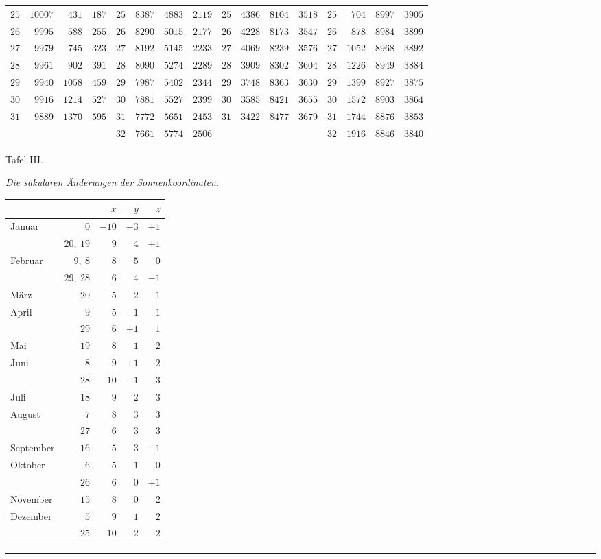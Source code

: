 \begin{center}
{{\begin{minipage}{.96\linewidth}
\begin{tabular}{r|r|r|r||r|r|r|r||r|r|r|r||r|r|r|r}
$25$ & $10007$ & $431$ & $187$ & $25$ & $8387$ & $4883$ & $2119$ & $25$ & $4386$ & $8104$ & $3518$ & $25$ & $704$ & $8997$ & $3905$\\[3pt]
$26$ & $9995$ & $588$ & $255$ & $26$ & $8290$ & $5015$ & $2177$ & $26$ & $4228$ & $8173$ & $3547$ & $26$ & $878$ & $8984$ & $3899$\\
$27$ & $9979$ & $745$ & $323$ & $27$ & $8192$ & $5145$ & $2233$ & $27$ & $4069$ & $8239$ & $3576$ & $27$ & $1052$ & $8968$ & $3892$\\
$28$ & $9961$ & $902$ & $391$ & $28$ & $8090$ & $5274$ & $2289$ & $28$ & $3909$ & $8302$ & $3604$ & $28$ & $1226$ & $8949$ & $3884$\\
$29$ & $9940$ & $1058$ & $459$ & $29$ & $7987$ & $5402$ & $2344$ & $29$ & $3748$ & $8363$ & $3630$ & $29$ & $1399$ & $8927$ & $3875$\\
$30$ & $9916$ & $1214$ & $527$ & $30$ & $7881$ & $5527$ & $2399$ & $30$ & $3585$ & $8421$ & $3655$ & $30$ & $1572$ & $8903$ & $3864$\\[3pt]
$31$ & $9889$ & $1370$ & $595$ & $31$ & $7772$ & $5651$ & $2453$ & $31$ & $3422$ & $8477$ & $3679$ & $31$ & $1744$ & $8876$ & $3853$\\
 &  &  &  & $32$ & $7661$ & $5774$ & $2506$ &  &  &  &  & $32$ & $1916$ & $8846$ & $3840$\\
\end{tabular}\endgroup
\end{minipage}}}\endgroup
\end{center}
\clearpage
{}%
\begin{center}
Tafel III.

\medskip\emph{Die säkularen Änderungen der Sonnenkoordinaten.}\medskip

\begin{tabular}{lr|r|r|r}
&&$x$&$y$&$z$\\\hline
Januar &$0$&$-10$&$-3$&$+1$\\
&$20,\ 19$&$9$&$4$&$+1$\\
Februar &$9,\ 8$&$8$&$5$&$0$\\
&$29,\ 28$&$6$&$4$&$-1$\\
März &$20$&$5$&$2$&$1$\\
April &$9$&$5$&$-1$&$1$\\
&$29$&$6$&$+1$&$1$\\
Mai &$19$&$8$&$1$&$2$\\
Juni &$8$&$9$&$+1$&$2$\\
&$28$&$10$&$-1$&$3$\\
Juli &$18$&$9$&$2$&$3$\\
August &$7$&$8$&$3$&$3$\\
&$27$&$6$&$3$&$3$\\
September &$16$&$5$&$3$&$-1$\\
Oktober &$6$&$5$&$1$&$0$\\
&$26$&$6$&$0$&$+1$\\
November &$15$&$8$&$0$&$2$\\
Dezember &$5$&$9$&$1$&$2$\\
&$25$&$10$&$2$&$2$
\end{tabular}
\end{center}
\begin{center}\rule{0.18\linewidth}{0.4pt}\end{center}
